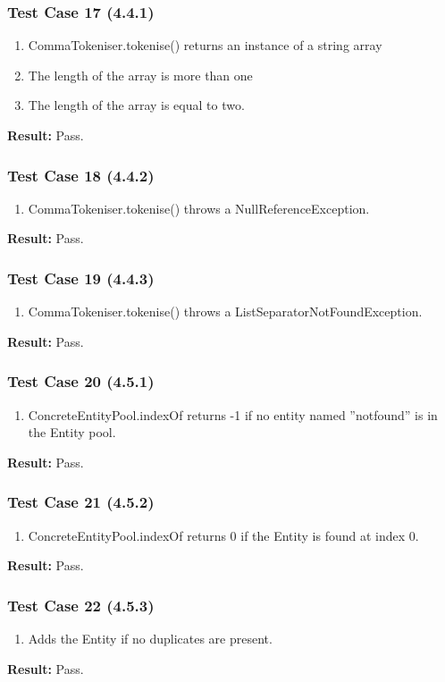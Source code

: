 \documentclass[a4paper,12pt]{article}
\begin{document}
		\subsubsection{Test Case 17 (4.4.1)}
				\begin{enumerate}
					\item CommaTokeniser.tokenise() returns an instance of a string array
					\item The length of the array is more than one
					\item The length of the array is equal to two.
				\end{enumerate}
			\textbf{Result: }Pass.
		\subsubsection{Test Case 18 (4.4.2)}
				\begin{enumerate}
					\item CommaTokeniser.tokenise() throws a NullReferenceException.
				\end{enumerate}
			\textbf{Result: }Pass.
		\subsubsection{Test Case 19 (4.4.3)}
				\begin{enumerate}
					\item CommaTokeniser.tokenise() throws a ListSeparatorNotFoundException.
				\end{enumerate}
			\textbf{Result: }Pass.
		\subsubsection{Test Case 20 (4.5.1)}
				\begin{enumerate}
					\item ConcreteEntityPool.indexOf returns -1 if no entity named ”notfound” is in the Entity pool.
				\end{enumerate}
			\textbf{Result: }Pass.
		\subsubsection{Test Case 21 (4.5.2)}
				\begin{enumerate}
					\item ConcreteEntityPool.indexOf returns 0 if the Entity is found at index 0.
				\end{enumerate}
			\textbf{Result: }Pass.
		\subsubsection{Test Case 22 (4.5.3)}
				\begin{enumerate}
					\item Adds the Entity if no duplicates are present.
				\end{enumerate}
			\textbf{Result: }Pass.
\end{document}
